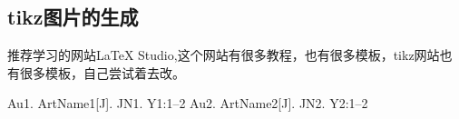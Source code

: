 \documentclass[UTF8,twocolumn, a4paper]{ctexart}
\begin{document}
    \subsection{tikz图片的生成}
    推荐学习的网站LaTeX Studio,这个网站有很多教程，也有很多模板，tikz网站也有很多模板，自己尝试着去改。


\begin{thebibliography}{99}
\addtolength{\itemsep}{-2ex} %
Au1. ArtName1[J]. JN1. Y1:1--2
Au2. ArtName2[J]. JN2. Y2:1--2
\end{thebibliography}    
    
\end{document}
